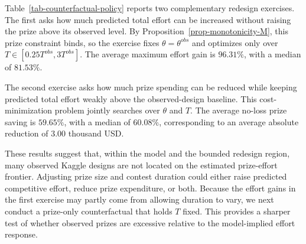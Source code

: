 \documentclass[mnsc]{informs3}
\begin{document}
Table~\ref{tab-counterfactual-policy} reports two complementary redesign
exercises. The first asks how much predicted total effort can be increased
without raising the prize above its observed level. By
Proposition~\ref{prop-monotonicity-M}, this prize constraint binds, so the
exercise fixes $\theta=\theta^{obs}$ and optimizes only over
$T\in[0.25T^{obs},3T^{obs}]$. The average maximum effort gain is $96.31\%$,
with a median of $81.53\%$.

The second exercise asks how much prize spending can be reduced while keeping
predicted total effort weakly above the observed-design baseline. This
cost-minimization problem jointly searches over $\theta$ and $T$. The average
no-loss prize saving is $59.65\%$, with a median of $60.08\%$, corresponding to
an average absolute reduction of $3.00$ thousand USD.

These results suggest that, within the model and the bounded redesign region,
many observed Kaggle designs are not located on the estimated prize-effort
frontier. Adjusting prize size and contest duration could either raise predicted
competitive effort, reduce prize expenditure, or both. Because the effort gains
in the first exercise may partly come from allowing duration to vary, we next
conduct a prize-only counterfactual that holds $T$ fixed. This provides a sharper
test of whether observed prizes are excessive relative to the model-implied
effort response.
\end{document}

